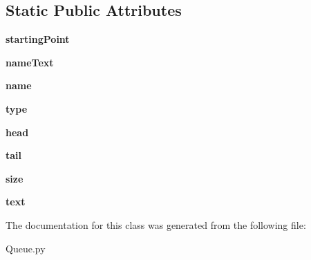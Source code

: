 \subsection*{Static Public Attributes}
\begin{DoxyCompactItemize}
\item 
{\bfseries starting\+Point}\hypertarget{class_queue_1_1_queue_ab4a0969d72be3d0fb08e02a33a985640}{}\label{class_queue_1_1_queue_ab4a0969d72be3d0fb08e02a33a985640}

\item 
{\bfseries name\+Text}\hypertarget{class_queue_1_1_queue_a692f39189799e9729806e99e59dff97d}{}\label{class_queue_1_1_queue_a692f39189799e9729806e99e59dff97d}

\item 
{\bfseries name}\hypertarget{class_queue_1_1_queue_abd20d1d760a1275d551b4eebd709c110}{}\label{class_queue_1_1_queue_abd20d1d760a1275d551b4eebd709c110}

\item 
{\bfseries type}\hypertarget{class_queue_1_1_queue_a1e239f58b74790246aeec49e81f9052d}{}\label{class_queue_1_1_queue_a1e239f58b74790246aeec49e81f9052d}

\item 
{\bfseries head}\hypertarget{class_queue_1_1_queue_a9a2010a83cf36c0d23c2d90396cd3796}{}\label{class_queue_1_1_queue_a9a2010a83cf36c0d23c2d90396cd3796}

\item 
{\bfseries tail}\hypertarget{class_queue_1_1_queue_a70d68f8c761879b479bac48d291c0671}{}\label{class_queue_1_1_queue_a70d68f8c761879b479bac48d291c0671}

\item 
{\bfseries size}\hypertarget{class_queue_1_1_queue_a88cc9ea7e3c5ad6afb3635b1f493bfcd}{}\label{class_queue_1_1_queue_a88cc9ea7e3c5ad6afb3635b1f493bfcd}

\item 
{\bfseries text}\hypertarget{class_queue_1_1_queue_a13809fa8a00047c724274dc36d7255e0}{}\label{class_queue_1_1_queue_a13809fa8a00047c724274dc36d7255e0}

\end{DoxyCompactItemize}


The documentation for this class was generated from the following file\+:\begin{DoxyCompactItemize}
\item 
Queue.\+py\end{DoxyCompactItemize}
